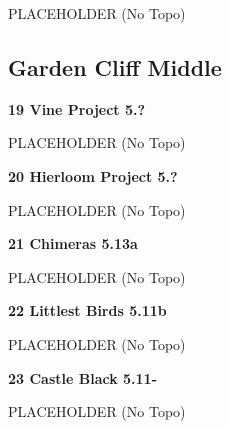 \begin{multicols}{2}
			\begin{adjustwidth}{0.5cm}{}			
			PLACEHOLDER (No Topo)
			\end{adjustwidth}
			
			
		
		
		\needspace{1.5cm}
		\subsection*{Garden Cliff Middle}\label{bf:Garden Cliff Middle}
			
		
			
			\needspace{1.5cm}
\label{rt:Vine Project}
\colorbox{black!20}{
\parbox{0.95\linewidth}{
\textbf{
19 Vine Project 5.?  
}}}

			\begin{adjustwidth}{0.5cm}{}			
			PLACEHOLDER (No Topo)
			\end{adjustwidth}
			
			
			
			\needspace{1.5cm}
\label{rt:Hierloom Project}
\colorbox{black!20}{
\parbox{0.95\linewidth}{
\textbf{
20 Hierloom Project 5.?  
}}}

			\begin{adjustwidth}{0.5cm}{}			
			PLACEHOLDER (No Topo)
			\end{adjustwidth}
			
			
			
			\needspace{1.5cm}
\label{rt:Chimeras}
\colorbox{Goldenrod!50}{
\parbox{0.95\linewidth}{
\textbf{
21 Chimeras 5.13a  
}}}

			\begin{adjustwidth}{0.5cm}{}			
			PLACEHOLDER (No Topo)
			\end{adjustwidth}
			
			
			
			\needspace{1.5cm}
\label{rt:Littlest Birds}
\colorbox{RoyalBlue!20}{
\parbox{0.95\linewidth}{
\textbf{
22 Littlest Birds 5.11b  
}}}

			\begin{adjustwidth}{0.5cm}{}			
			PLACEHOLDER (No Topo)
			\end{adjustwidth}
			
			
			
			\needspace{1.5cm}
\label{rt:Castle Black}
\colorbox{RoyalBlue!20}{
\parbox{0.95\linewidth}{
\textbf{
23 Castle Black 5.11-  
}}}

			\begin{adjustwidth}{0.5cm}{}			
			PLACEHOLDER (No Topo)
			\end{adjustwidth}
			

\end{multicols}
